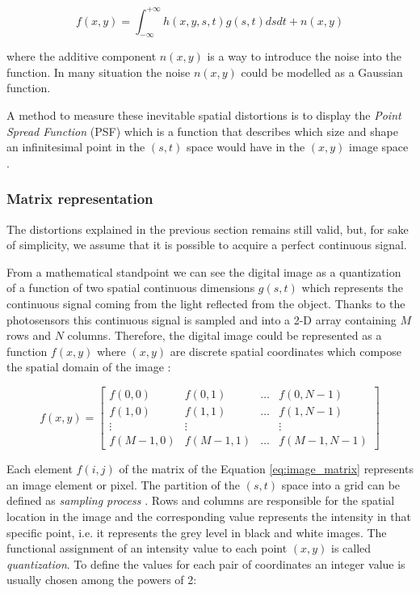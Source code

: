 \documentclass[../main.tex]{subfiles}
\begin{document}
\begin{equation} \label{eq:imageacquisition+noise}
    f(x,y) = \int_{-\infty}^{+\infty} h(x,y,s,t)g(s,t) dsdt  + n(x,y)
\end{equation}

where the additive component $n(x,y)$ is a way to introduce the noise into the function. 
In many situation the noise $n(x,y)$ could be modelled as a Gaussian function.

A method to measure these inevitable spatial distortions is to display the \textit{Point Spread Function} (PSF) which is a function that describes which size and shape an infinitesimal point in the $(s,t)$ space would have in the $(x,y)$ image space \cite{bourne2010fundamentals}.

\subsubsection{Matrix representation}\label{sec:matrix_representation}

The distortions explained in the previous section remains still valid, but, for sake of simplicity, we assume that it is possible to acquire a perfect continuous signal.

From a mathematical standpoint we can see the digital image as a quantization of a  function of two spatial continuous dimensions $g(s,t)$ which represents the continuous signal coming from the light reflected from the object.
Thanks to the photosensors this continuous signal is sampled and into a 2-D array containing $M$ rows and $N$ columns. Therefore, the digital image could be represented as a function $f(x,y)$ where $(x,y)$ are discrete spatial coordinates which compose the spatial domain of the image \cite{digital_image_processing_gonzales}:

\begin{equation}\label{eq:image_matrix}
    f(x,y) = \begin{bmatrix} f(0,0) & f(0,1) & \dots & f(0,N-1)\\
                            f(1,0) & f(1,1) & \dots & f(1,N-1)\\
                            \vdots & \vdots &     & \vdots \\
                            f(M-1,0) & f(M-1,1) & \dots & f(M-1,N-1)
             \end{bmatrix}
\end{equation}

Each element $f(i,j)$ of the matrix of the Equation \ref{eq:image_matrix} represents an image element or pixel. The partition of the $(s,t)$ space into a grid can be defined as \textit{sampling process} \cite{digital_image_processing_gonzales}. Rows and columns are responsible for the spatial location in the image and the corresponding value represents the intensity in that specific point, i.e. it represents the grey level  in black and white images\cite{annadurai2007fundamentals}. The functional assignment of an intensity value to each point $(x,y)$ is called \textit{quantization}\cite{digital_image_processing_gonzales}.
To define the values for each pair of coordinates an integer value is usually chosen among the powers of 2:
\end{document}
